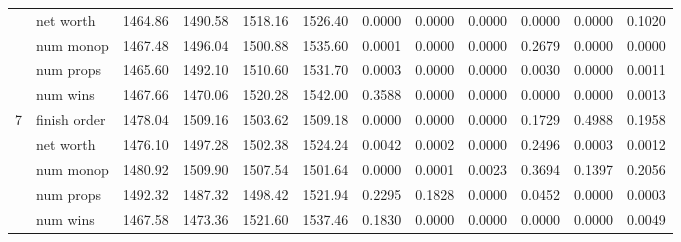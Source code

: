 \begin{landscape}
\begin{table}[ht]
\begin{tabularx}{\linewidth}{|p{1in}|p{1in}|r|r|r|r|r|r|r|r|r|r|}
\cline{2-12}             & net worth & 1464.86 & 1490.58 & \cellcolor{green!55!white}1518.16 & \cellcolor{green!55!white}1526.40 & 0.0000 & 0.0000 & 0.0000 & 0.0000 & 0.0000 & \cellcolor{red!55!white}0.1020 \\
\cline{2-12}             & num monop & 1467.48 & 1496.04 & \cellcolor{green!55!white}1500.88 & \cellcolor{green!55!white}1535.60 & 0.0001 & 0.0000 & 0.0000 & \cellcolor{red!55!white}0.2679 & 0.0000 & 0.0000 \\
\cline{2-12}             & num props & 1465.60 & 1492.10 & \cellcolor{green!55!white}1510.60 & \cellcolor{green!55!white}1531.70 & 0.0003 & 0.0000 & 0.0000 & 0.0030 & 0.0000 & 0.0011 \\
\cline{2-12}             & num wins & 1467.66 & 1470.06 & \cellcolor{green!55!white}1520.28 & \cellcolor{green!55!white}1542.00 & \cellcolor{red!55!white}0.3588 & 0.0000 & 0.0000 & 0.0000 & 0.0000 & 0.0013 \\
      \cline{1-12}
      \multirow{5}{*}{7} & finish order & 1478.04 & \cellcolor{green!55!white}1509.16 & \cellcolor{green!55!white}1503.62 & \cellcolor{green!55!white}1509.18 & 0.0000 & 0.0000 & 0.0000 & \cellcolor{red!55!white}0.1729 & \cellcolor{red!55!white}0.4988 & \cellcolor{red!55!white}0.1958 \\
\cline{2-12}             & net worth & 1476.10 & 1497.28 & \cellcolor{green!55!white}1502.38 & \cellcolor{green!55!white}1524.24 & 0.0042 & 0.0002 & 0.0000 & \cellcolor{red!55!white}0.2496 & 0.0003 & 0.0012 \\
\cline{2-12}             & num monop & 1480.92 & \cellcolor{green!55!white}1509.90 & \cellcolor{green!55!white}1507.54 & \cellcolor{green!55!white}1501.64 & 0.0000 & 0.0001 & 0.0023 & \cellcolor{red!55!white}0.3694 & \cellcolor{red!55!white}0.1397 & \cellcolor{red!55!white}0.2056 \\
\cline{2-12}             & num props & 1492.32 & 1487.32 & 1498.42 & \cellcolor{green!55!white}1521.94 & \cellcolor{red!55!white}0.2295 & \cellcolor{red!55!white}0.1828 & 0.0000 & \cellcolor{red!55!white}0.0452 & 0.0000 & 0.0003 \\
\cline{2-12}             & num wins & 1467.58 & 1473.36 & \cellcolor{green!55!white}1521.60 & \cellcolor{green!55!white}1537.46 & \cellcolor{red!55!white}0.1830 & 0.0000 & 0.0000 & 0.0000 & 0.0000 & 0.0049 \\

      \cline{1-12}
    \end{tabularx}%
  \label{tab:intrapop1024_finorder}%
\end{table}%

\end{landscape}